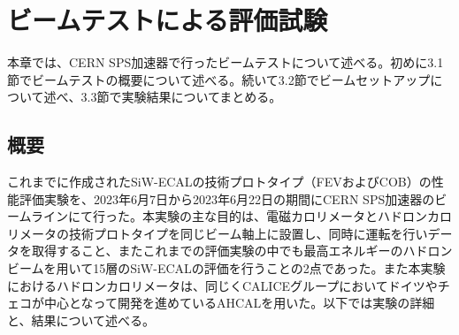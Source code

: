 
\chapter{ビームテストによる評価試験} \label{sec:Beamtest}
本章では、CERN SPS加速器で行ったビームテストについて述べる。初めに3.1節でビームテストの概要について述べる。続いて3.2節でビームセットアップについて述べ、3.3節で実験結果についてまとめる。
\section{概要}
これまでに作成されたSiW-ECALの技術プロトタイプ（FEVおよびCOB）の性能評価実験を、2023年6月7日から2023年6月22日の期間にCERN SPS加速器のビームラインにて行った。本実験の主な目的は、電磁カロリメータとハドロンカロリメータの技術プロトタイプを同じビーム軸上に設置し、同時に運転を行いデータを取得すること、またこれまでの評価実験の中でも最高エネルギーのハドロンビームを用いて15層のSiW-ECALの評価を行うことの2点であった。また本実験におけるハドロンカロリメータは、同じくCALICEグループにおいてドイツやチェコが中心となって開発を進めているAHCALを用いた。以下では実験の詳細と、結果について述べる。
